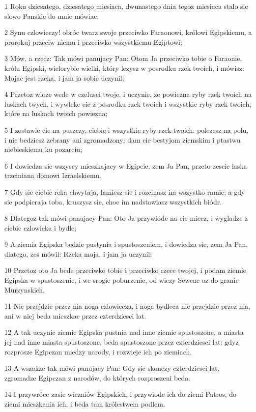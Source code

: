 \par 1 Roku dziesatego, dziesatego miesiaca, dwunastego dnia tegoz miesiaca stalo sie slowo Panskie do mnie mówiac:
\par 2 Synu czlowieczy! obróc twarz swoje przeciwko Faraonowi, królowi Egipskiemu, a prorokuj przeciw niemu i przeciwko wszystkiemu Egiptowi;
\par 3 Mów, a rzecz: Tak mówi panujacy Pan: Otom Ja przeciwko tobie o Faraonie, królu Egipski, wielorybie wielki, który lezysz w posrodku rzek twoich, i mówisz: Mojac jest rzeka, i jam ja sobie uczynil;
\par 4 Przetoz wloze wede w czelusci twoje, i uczynie, ze powiezna ryby rzek twoich na luskach twych, i wywleke cie z posrodku rzek twoich i wszystkie ryby rzek twoich, które na luskach twoich powiezna;
\par 5 I zostawie cie na puszczy, ciebie i wszystkie ryby rzek twoich: polezesz na polu, i nie bedziesz zebrany ani zgromadzony; dam cie bestyjom ziemskim i ptastwu niebieskiemu ku pozarciu;
\par 6 I dowiedza sie wszyscy mieszkajacy w Egipcie, zem Ja Pan, przeto zescie laska trzciniana domowi Izraelskiemu.
\par 7 Gdy sie ciebie reka chwytaja, lamiesz sie i rozcinasz im wszystko ramie; a gdy sie podpieraja toba, kruszysz sie, choc im nadstawiasz wszystkich biódr.
\par 8 Dlategoz tak mówi panujacy Pan: Oto Ja przywiode na cie miecz, i wygladze z ciebie czlowieka i bydle;
\par 9 A ziemia Egipska bedzie pustynia i spustoszeniem, i dowiedza sie, zem Ja Pan, dlatego, zes mówil: Rzeka moja, i jam ja uczynil;
\par 10 Przetoz oto Ja bede przeciwko tobie i przeciwko rzece twojej, i podam ziemie Egipska w spustoszenie, i we srogie poburzenie, od wiezy Sewene az do granic Murzynskich.
\par 11 Nie przejdzie przez nia noga czlowiecza, i noga bydleca nie przejdzie przez nia, ani w niej beda mieszkac przez czterdziesci lat.
\par 12 A tak uczynie ziemie Egipska pustnia nad inne ziemie spustoszone, a miasta jej nad inne miasta spustoszone, beda spustoszone przez czterdziesci lat: gdyz rozprosze Egipczan miedzy narody, i rozwieje ich po ziemiach.
\par 13 A wszakze tak mówi panujacy Pan: Gdy sie skonczy czterdziesci lat, zgromadze Egipczan z narodów, do których rozproszeni beda.
\par 14 I przywróce zasie wiezniów Egipskich, i przywiode ich do ziemi Patros, do ziemi mieszkania ich, i beda tam królestwem podlem.
